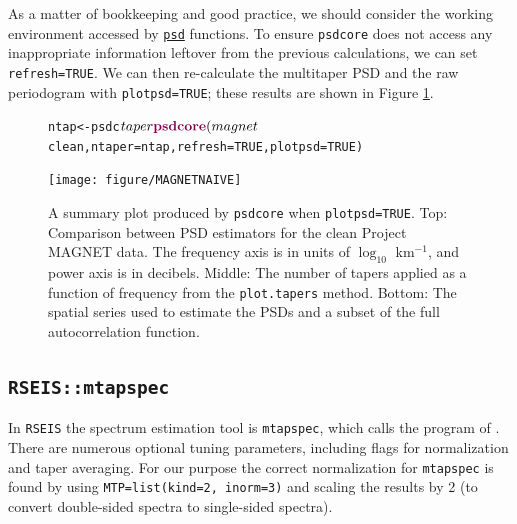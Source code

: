 \documentclass{article}\usepackage{graphicx, color}
\makeatletter
\newcommand{\hlfunctioncall}[1]{\textcolor[rgb]{0.501960784313725,0,0.329411764705882}{\textbf{#1}}}%
\newenvironment{kframe}{%
 \def\at@end@of@kframe{}%
 \ifinner\ifhmode%
  \def\at@end@of@kframe{\end{minipage}}%
  \begin{minipage}{\columnwidth}%
 \fi\fi%
 \def\FrameCommand##1{\hskip\@totalleftmargin \hskip-\fboxsep
 \colorbox{shadecolor}{##1}\hskip-\fboxsep
     \hskip-\linewidth \hskip-\@totalleftmargin \hskip\columnwidth}%
 \MakeFramed {\advance\hsize-\width
   \@totalleftmargin\z@ \linewidth\hsize
   \@setminipage}}%
 {\par\unskip\endMakeFramed%
 \at@end@of@kframe}
\newenvironment{knitrout}{}{} %
\newcommand{\Rcmd}[1]{\texttt{#1}}
\newcommand{\psd}[0]{\href{http://abarbour.github.com/psd/}{\color{blue}\Rcmd{psd}}}
\makeatother
\begin{document}
As a matter of bookkeeping and good practice, 
we should consider the working environment
accessed by \psd{} functions.
To ensure
\Rcmd{psdcore} does not access any inappropriate information leftover
from the previous calculations, we
can set \Rcmd{refresh=TRUE}.
We can then
re-calculate the multitaper PSD and the
raw periodogram with \Rcmd{plotpsd=TRUE}; these
results are shown in Figure \ref{fig:two}.
%
\begin{figure}[htb!]
\begin{center}
\begin{knitrout}
\color{fgcolor}\begin{kframe}
\begin{alltt}
ntap <- psdc$taper
\hlfunctioncall{psdcore}(magnet$clean, ntaper = ntap, refresh = TRUE, plotpsd = TRUE)
\end{alltt}
\end{kframe}
\texttt{[image: figure/MAGNETNAIVE]} 

\end{knitrout}

\caption{A summary plot produced by \Rcmd{psdcore} when
\Rcmd{plotpsd=TRUE}.  
Top: Comparison between PSD estimators for the 
clean Project MAGNET data. The frequency axis is in units of $\log_{10}$ km$^{-1}$,
and power axis is in decibels.
Middle: The number of tapers applied as a function of frequency from
the \Rcmd{plot.tapers} method. 
Bottom: The spatial series used to estimate the PSDs and a subset
of the full autocorrelation function.}
\label{fig:two}
\end{center}
\end{figure}

\subsection{\Rcmd{RSEIS::mtapspec}}

In \Rcmd{RSEIS} the spectrum estimation tool is \Rcmd{mtapspec}, which
calls the program of \citet{lees1995}.
There are numerous optional tuning parameters, including
flags for
normalization and taper averaging.  
For our
purpose the correct normalization for \Rcmd{mtapspec} is found
by using
\Rcmd{MTP=list(kind=2, inorm=3)} and scaling the results by 2 (to convert
double-sided spectra to single-sided spectra).
\end{document}
